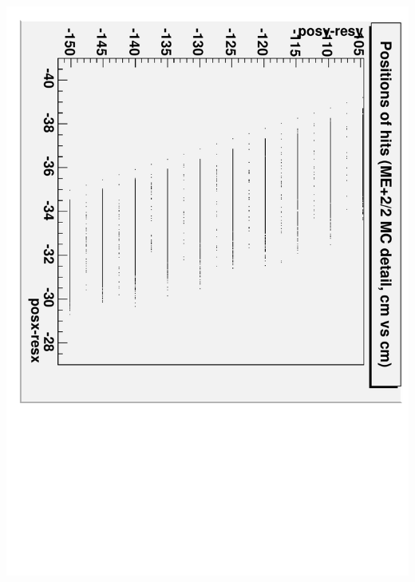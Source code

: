 \documentclass[compress]{beamer}
\begin{document}
\begin{frame}
\begin{columns}
\includegraphics[height=\linewidth, angle=90]{MC_positions_of_hits_detail.pdf}
\end{columns}
\end{frame}
\end{document}
